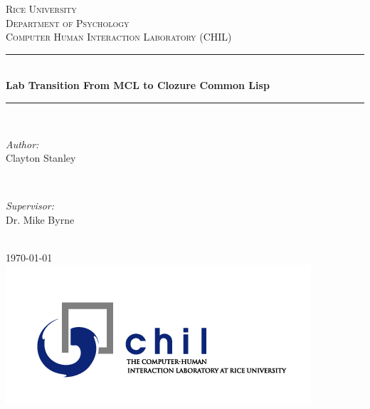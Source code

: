 \documentclass[12pt]{article} %
\begin{document}

\begin{titlepage}

  \newcommand{\HRule}{\rule{\linewidth}{0.5mm}} %

  \center %

  \textsc{\LARGE Rice University}\\[1.5cm] %
  \textsc{\Large Department of Psychology}\\[0.5cm] %
  \textsc{\large Computer Human Interaction Laboratory (CHIL)}\\[0.5cm] %


  \HRule \\[0.4cm]
  { \huge \bfseries Lab Transition From MCL to Clozure Common Lisp}\\[0.4cm] %
  \HRule \\[1.5cm]

  \begin{minipage}{0.4\textwidth}
    \begin{flushleft} \large
      \emph{Author:}\\
      Clayton Stanley %
    \end{flushleft}
  \end{minipage}
  ~
  \begin{minipage}{0.4\textwidth}
    \begin{flushright} \large
      \emph{Supervisor:} \\
      Dr. Mike Byrne %
    \end{flushright}
  \end{minipage}\\[4cm]

  {\large \today}\\[1cm] %

  \includegraphics[scale=.5]{ChilLogo} %

  \vfill %

\end{titlepage}
\end{document}
